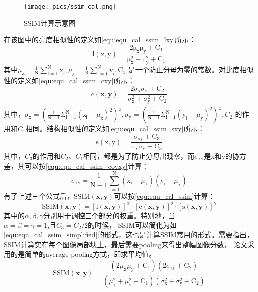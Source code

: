 \begin{figure}[htbp]
    \centering
    \texttt{[image: pics/ssim\_cal.png]}
    \caption{\label{fig:img_ssim_cal}SSIM计算示意图}
\end{figure}
在该图中的亮度相似性的定义如\autoref{equ:equ_cal_ssim_lxy}所示：
\begin{equation}
    \label{equ:equ_cal_ssim_lxy}
    \mathrm{l(x,y)=\frac{2\mu_x\mu_y+C_1}{\mu_x^2+\mu_y^2+C_1}}
\end{equation}
其中\(\mu_\mathrm{x}=\frac{1}{\mathrm{N}}\sum_{\mathrm{i}=1}^\mathrm{N} \mathrm{x_i}, \mu_\mathrm{y}=\frac{1}{\mathrm{N}}\sum_{\mathrm{i}=1}^\mathrm{N} \mathrm{y_i}, \mathrm{C_1}\)
是一个防止分母为零的常数。对比度相似性的定义如\autoref{equ:equ_cal_ssim_cxy}所示：
\begin{equation}
    \label{equ:equ_cal_ssim_cxy}
    \mathrm{c}(\mathbf{x},\mathbf{y})=\frac{2\sigma_\mathrm{x}\sigma_\mathrm{y}+\mathrm{C}_2}{\sigma_\mathrm{x}^2+\sigma_\mathrm{y}^2+\mathrm{C}_2}
\end{equation}
其中，\(\sigma_{\mathrm{x}}=\left(\frac1{\mathrm{N}-1}\Sigma_{\mathrm{i}=1}^{\mathrm{N}}\left(\mathrm{x}_{\mathrm{i}}-\mu_{\mathrm{x}}\right)^{2}\right)^{\frac12},\sigma_{\mathrm{y}}=\left(\frac1{\mathrm{N}-1}\Sigma_{\mathrm{i}=1}^{\mathrm{N}}\left(\mathrm{y}_{\mathrm{i}}-\mu_{\mathrm{y}}\right)^{2}\right)^{\frac12},C_{2}\)
的作用和\(C_1\)相同。结构相似性的定义如\autoref{equ:equ_cal_ssim_sxy}所示：
\begin{equation}
    \label{equ:equ_cal_ssim_sxy}
    \mathrm{s(x,y)=\frac{\sigma_{xy}+C_3}{\sigma_x\sigma_y+C_3}}
\end{equation}
其中，\(C_3\)的作用和\(C_2、C_1\)相同，都是为了防止分母出现零，而\(\sigma_{\mathrm{xy}}\)是x和y的协方差，其可以按\autoref{equ:equ_cal_ssim_covxy}计算：
\begin{equation}
    \label{equ:equ_cal_ssim_covxy}
    \sigma_{\mathrm{xy}}=\frac1{\mathrm{N}-1}\sum_{\mathrm{i}=1}^{\mathrm{N}}(\mathrm{x_i}-\mu_\mathrm{x})(\mathrm{y_i}-\mu_\mathrm{y})
\end{equation}
有了上述三个公式后，\(\mathrm{SSIM}(\mathbf{x},\mathbf{y})\)可以按\autoref{equ:equ_cal_ssim}计算：
\begin{equation}
    \label{equ:equ_cal_ssim}
    \mathrm{SSIM}(\mathbf{x},\mathbf{y})=[\mathrm{l}(\mathbf{x},\mathbf{y})]^\alpha\cdot[\mathrm{c}(\mathbf{x},\mathbf{y})]^\beta\cdot[\mathrm{s}(\mathbf{x},\mathbf{y})]^\gamma 
\end{equation}
其中的\(\alpha,\beta,\gamma \)分别用于调控三个部分的权重。特别地，当\(\alpha{=}\beta{=}\gamma{=}1\text{,且}C_3=C_2/2\)的时候，
SSIM可以简化为如\autoref{equ:equ_cal_ssim_simplified}的形式，这也是计算SSIM常用的形式。需要指出，SSIM计算实在每个图像局部块上，最后需要pooling来得出整幅图像分数，
论文采用的是简单的average pooling方式，即求平均值。
\begin{equation}
    \label{equ:equ_cal_ssim_simplified}
    \mathrm{SSIM}(\mathbf{x},\mathbf{y})=\frac{(2\mu_\mathrm{x}\mu_\mathrm{y}+\mathrm{C}_1)(2\sigma_\mathrm{xy}+\mathrm{C}_2)}{(\mu_\mathrm{x}^2+\mu_\mathrm{y}^2+\mathrm{C}_1)(\sigma_\mathrm{x}^2+\sigma_\mathrm{y}^2+\mathrm{C}_2)}
\end{equation}


